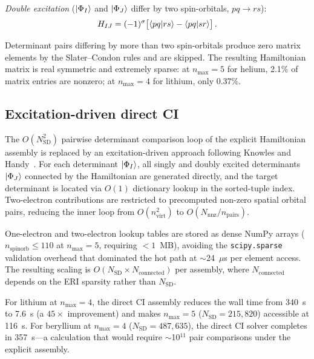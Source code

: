 \documentclass[aps,pra,twocolumn,superscriptaddress,longbibliography,floatfix]{revtex4-2}
\begin{document}
\emph{Double excitation} ($\ket{\Phi_I}$ and $\ket{\Phi_J}$ differ
by two spin-orbitals, $pq \to rs$):
\begin{equation}
H_{IJ} = (-1)^{\sigma}
\bigl[\braket{pq|rs} - \braket{pq|sr}\bigr]\,.
\label{eq:sc_double}
\end{equation}

Determinant pairs differing by more than two spin-orbitals produce
zero matrix elements by the Slater--Condon rules and are skipped.
The resulting Hamiltonian matrix is real symmetric and extremely
sparse: at $n_{\max} = 5$ for helium, 2.1\% of matrix entries
are nonzero; at $n_{\max} = 4$ for lithium, only 0.37\%.

\subsection{Excitation-driven direct CI}
\label{sec:direct_ci}

The $O(N_{\text{SD}}^2)$ pairwise determinant comparison loop of the
explicit Hamiltonian assembly is replaced by an excitation-driven
approach following Knowles and Handy~\cite{Knowles1984}.
For each determinant $\ket{\Phi_I}$, all singly and doubly excited
determinants $\ket{\Phi_J}$ connected by the Hamiltonian are generated
directly, and the target determinant is located via $O(1)$ dictionary
lookup in the sorted-tuple index.
Two-electron contributions are restricted to precomputed non-zero
spatial orbital pairs, reducing the inner loop from $O(n_{\text{virt}}^2)$
to $O(N_{\text{nnz}}/n_{\text{pairs}})$.

One-electron and two-electron lookup tables are stored as dense NumPy
arrays ($n_{\text{spinorb}} \leq 110$ at $n_{\max} = 5$, requiring
$<1$~MB), avoiding the \texttt{scipy.sparse} validation overhead that
dominated the hot path at $\sim$24~$\mu$s per element access.
The resulting scaling is
$O(N_{\text{SD}} \times N_{\text{connected}})$ per assembly,
where $N_{\text{connected}}$ depends on the ERI sparsity rather than
$N_{\text{SD}}$.

For lithium at $n_{\max}=4$, the direct CI assembly reduces the
wall time from 340~s to 7.6~s (a $45\times$ improvement) and makes
$n_{\max}=5$ ($N_{\text{SD}} = 215{,}820$) accessible at 116~s.
For beryllium at $n_{\max}=4$ ($N_{\text{SD}} = 487{,}635$), the
direct CI solver completes in 357~s---a calculation that would require
$\sim$10$^{11}$ pair comparisons under the explicit assembly.
\end{document}
